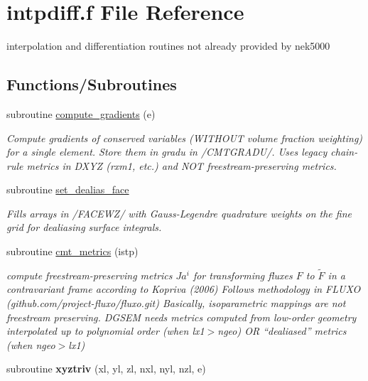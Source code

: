 \hypertarget{intpdiff_8f}{\section{intpdiff.\-f File Reference}
\label{intpdiff_8f}
}


interpolation and differentiation routines not already provided by nek5000  


\subsection*{Functions/\-Subroutines}
\begin{DoxyCompactItemize}
\item 
subroutine \hyperlink{intpdiff_8f_a5320a5bf1c50695504168747afc66c93}{compute\-\_\-gradients} (e)
\begin{DoxyCompactList}\small\item\em Compute gradients of conserved variables (W\-I\-T\-H\-O\-U\-T volume fraction weighting) for a single element. Store them in gradu in /\-C\-M\-T\-G\-R\-A\-D\-U/. Uses legacy chain-\/rule metrics in D\-X\-Y\-Z (rxm1, etc.) and N\-O\-T freestream-\/preserving metrics. \end{DoxyCompactList}\item 
subroutine \hyperlink{intpdiff_8f_a65689efbb78eee023a3a9a7d4b9caff7}{set\-\_\-dealias\-\_\-face}
\begin{DoxyCompactList}\small\item\em Fills arrays in /\-F\-A\-C\-E\-W\-Z/ with Gauss-\/\-Legendre quadrature weights on the fine grid for dealiasing surface integrals. \end{DoxyCompactList}\item 
\hypertarget{intpdiff_8f_a08d6fc46ac6dac9935c672df973519c9}{subroutine \hyperlink{intpdiff_8f_a08d6fc46ac6dac9935c672df973519c9}{cmt\-\_\-metrics} (istp)}\label{intpdiff_8f_a08d6fc46ac6dac9935c672df973519c9}

\begin{DoxyCompactList}\small\item\em compute freestream-\/preserving metrics $Ja^i$ for transforming fluxes $F$ to $\tilde{F}$ in a contravariant frame according to Kopriva (2006) Follows methodology in F\-L\-U\-X\-O (github.\-com/project-\/fluxo/fluxo.git) Basically, isoparametric mappings are not freestream preserving. D\-G\-S\-E\-M needs metrics computed from low-\/order geometry interpolated up to polynomial order (when lx1$>$ngeo) O\-R ``dealiased'' metrics (when ngeo$>$lx1) \end{DoxyCompactList}\item 
\hypertarget{intpdiff_8f_a354b767c6b8ae014e7292c05e45157c6}{subroutine {\bfseries xyztriv} (xl, yl, zl, nxl, nyl, nzl, e)}\label{intpdiff_8f_a354b767c6b8ae014e7292c05e45157c6}


\end{DoxyCompactItemize}
